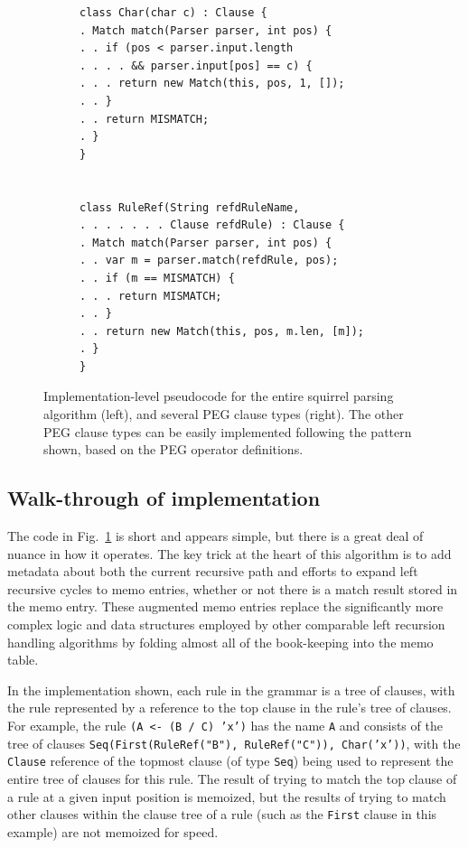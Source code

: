 \documentclass[manuscript]{acmart}
\begin{document}
\begin{figure}
\begin{subfigure}[t]{.4\linewidth}
\begin{lstlisting}[firstnumber=59,frame=none,xleftmargin=.18\textwidth]
class Char(char c) : Clause {
. Match match(Parser parser, int pos) {
. . if (pos < parser.input.length
. . . . && parser.input[pos] == c) {
. . . return new Match(this, pos, 1, []);
. . }
. . return MISMATCH;
. }
}


class RuleRef(String refdRuleName,
. . . . . . . Clause refdRule) : Clause {
. Match match(Parser parser, int pos) {
. . var m = parser.match(refdRule, pos);
. . if (m == MISMATCH) {
. . . return MISMATCH;
. . }
. . return new Match(this, pos, m.len, [m]);
. }
}
\end{lstlisting}
\end{subfigure}
\caption{Implementation-level pseudocode for the entire squirrel parsing algorithm (left), and several PEG clause types (right). The other PEG clause types can be easily implemented following the pattern shown, based on the PEG operator definitions.}
\label{fig:Code}
\end{figure}


\subsection{Walk-through of implementation}

The code in Fig.~\ref{fig:Code} is short and appears simple, but there is a great deal of nuance in how it operates. The key trick at the heart of this algorithm is to add metadata about both the current recursive path and efforts to expand left recursive cycles to memo entries, whether or not there is a match result stored in the memo entry. These augmented memo entries replace the significantly more complex logic and data structures employed by other comparable left recursion handling algorithms by folding almost all of the book-keeping into the memo table.

In the implementation shown, each rule in the grammar is a tree of clauses, with the rule represented by a reference to the top clause in the rule's tree of clauses. For example, the rule \texttt{(A <- (B / C) 'x')} has the name \texttt{A} and consists of the tree of clauses \texttt{Seq(First(RuleRef("B"), RuleRef("C")), Char('x'))}, with the \texttt{Clause} reference of the topmost clause (of type \texttt{Seq}) being used to represent the entire tree of clauses for this rule. The result of trying to match the top clause of a rule at a given input position is memoized, but the results of trying to match other clauses within the clause tree of a rule (such as the \texttt{First} clause in this example) are not memoized for speed.
\end{document}
